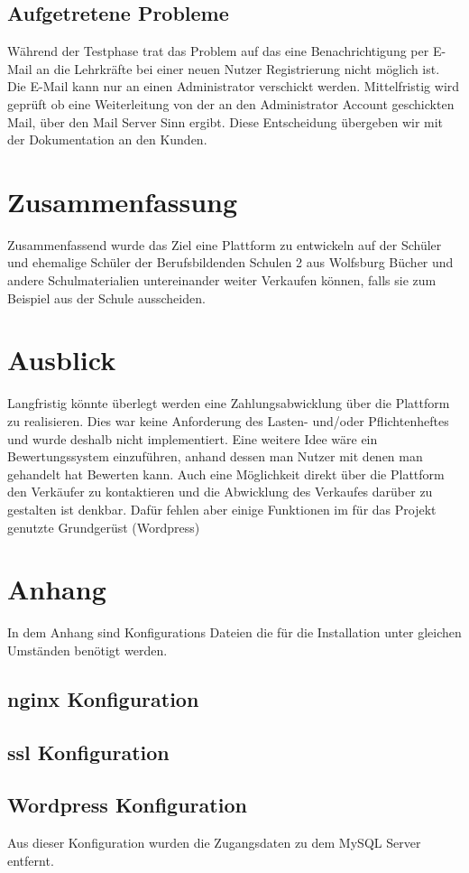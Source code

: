 \documentclass[a4paper, DIV20, 11pt, headsepline, parskip]{article}
\begin{document}
\subsection{Aufgetretene Probleme}
Während der Testphase trat das Problem auf das eine Benachrichtigung per E-Mail an die Lehrkräfte bei einer neuen Nutzer Registrierung nicht möglich ist.
Die E-Mail kann nur an einen Administrator verschickt werden.
Mittelfristig wird geprüft ob eine Weiterleitung von der an den Administrator Account geschickten Mail, über den Mail Server Sinn ergibt.
Diese Entscheidung übergeben wir mit der Dokumentation an den Kunden.
\section{Zusammenfassung}
Zusammenfassend wurde das Ziel eine Plattform zu entwickeln auf der Schüler und ehemalige Schüler der Berufsbildenden Schulen 2 aus Wolfsburg Bücher und andere Schulmaterialien untereinander weiter Verkaufen können, falls sie zum Beispiel aus der Schule ausscheiden.
\section{Ausblick}
Langfristig könnte überlegt werden eine Zahlungsabwicklung über die Plattform zu realisieren.
Dies war keine Anforderung des Lasten- und/oder Pflichtenheftes und wurde deshalb nicht implementiert.
Eine weitere Idee wäre ein Bewertungssystem einzuführen, anhand dessen man Nutzer mit denen man gehandelt hat Bewerten kann.
Auch eine Möglichkeit direkt über die Plattform den Verkäufer zu kontaktieren und die Abwicklung des Verkaufes darüber zu gestalten ist denkbar.
Dafür fehlen aber einige Funktionen im für das Projekt genutzte Grundgerüst (Wordpress)
\section{Anhang}
In dem Anhang sind Konfigurations Dateien die für die Installation unter gleichen Umständen benötigt werden.
\subsection{nginx Konfiguration}

\subsection{ssl Konfiguration}

\subsection{Wordpress Konfiguration}
Aus dieser Konfiguration wurden die Zugangsdaten zu dem MySQL Server entfernt.

\pagebreak
\end{document}

